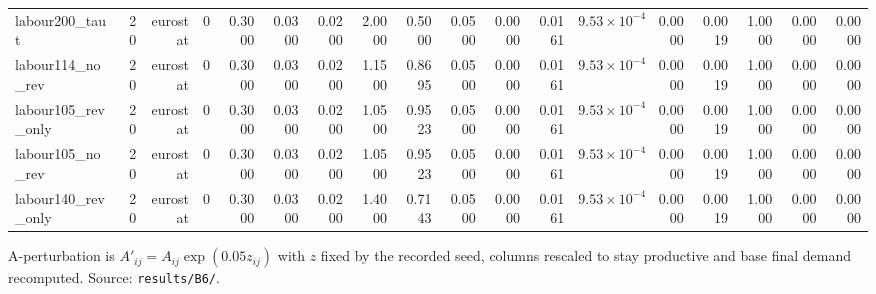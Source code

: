 \begin{table}[htbp]
\begin{tabular}{lrrrrrrrrrrrrrrrrr}
labour200\_taut & 20 & eurostat & 0 & 0.3000 & 0.0300 & 0.0200 & 2.0000 & 0.5000 & 0.0500 & 0.0000 & 0.0161 & $9.53\times10^{-4}$ & 0.0000 & 0.0019 & 1.0000 & 0.0000 & 0.0000 \\
labour114\_no\_rev & 20 & eurostat & 0 & 0.3000 & 0.0300 & 0.0200 & 1.1500 & 0.8695 & 0.0500 & 0.0000 & 0.0161 & $9.53\times10^{-4}$ & 0.0000 & 0.0019 & 1.0000 & 0.0000 & 0.0000 \\
labour105\_rev\_only & 20 & eurostat & 0 & 0.3000 & 0.0300 & 0.0200 & 1.0500 & 0.9523 & 0.0500 & 0.0000 & 0.0161 & $9.53\times10^{-4}$ & 0.0000 & 0.0019 & 1.0000 & 0.0000 & 0.0000 \\
labour105\_no\_rev & 20 & eurostat & 0 & 0.3000 & 0.0300 & 0.0200 & 1.0500 & 0.9523 & 0.0500 & 0.0000 & 0.0161 & $9.53\times10^{-4}$ & 0.0000 & 0.0019 & 1.0000 & 0.0000 & 0.0000 \\
labour140\_rev\_only & 20 & eurostat & 0 & 0.3000 & 0.0300 & 0.0200 & 1.4000 & 0.7143 & 0.0500 & 0.0000 & 0.0161 & $9.53\times10^{-4}$ & 0.0000 & 0.0019 & 1.0000 & 0.0000 & 0.0000 \\
\bottomrule
\end{tabular}
\par\smallskip
\begin{minipage}{\linewidth}\footnotesize A-perturbation is $A'_{ij}=A_{ij}\exp(0.05 z_{ij})$ with $z$ fixed by the recorded seed, columns rescaled to stay productive and base final demand recomputed. Source: \texttt{results/B6/}.\end{minipage}
\end{table}
